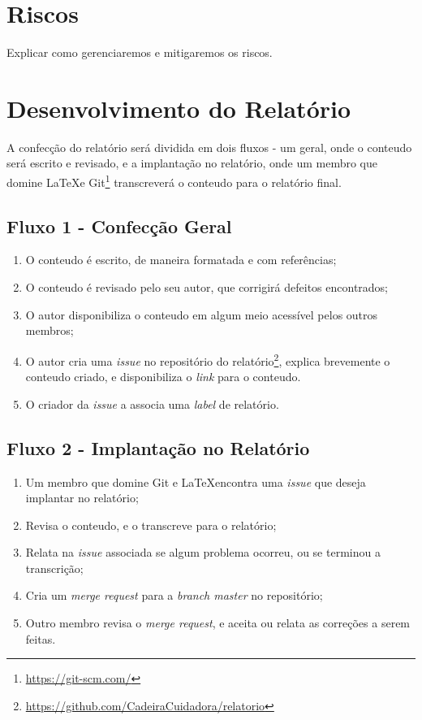 \section{Riscos}

Explicar como gerenciaremos e mitigaremos os riscos.

\section{Desenvolvimento do Relatório}

A confecção do relatório será dividida em dois fluxos - um geral, onde o
conteudo será escrito e revisado, e a implantação no relatório, onde um
membro que domine \LaTeX e
Git\footnote{\url{https://git-scm.com/}} transcreverá o conteudo para o
relatório final.

\subsection{Fluxo 1 - Confecção Geral}

\begin{enumerate}
  \item O conteudo é escrito, de maneira formatada e com referências;
  \item O conteudo é revisado pelo seu autor, que corrigirá defeitos encontrados;
  \item O autor disponibiliza o conteudo em algum meio acessível pelos outros membros;
  \item O autor cria uma \textit{issue} no repositório do
    relatório\footnote{\url{https://github.com/CadeiraCuidadora/relatorio}}, explica brevemente
    o conteudo criado, e disponibiliza o \textit{link} para o conteudo.
  \item O criador da \textit{issue} a associa uma \textit{label} de relatório.
\end{enumerate}

\subsection{Fluxo 2 - Implantação no Relatório}

\begin{enumerate}
  \item Um membro que domine Git e \LaTeX encontra uma \textit{issue} que deseja
  implantar no relatório;
  \item Revisa o conteudo, e o transcreve para o relatório;
  \item Relata na \textit{issue} associada se algum problema ocorreu, ou se terminou a transcrição;
  \item Cria um \textit{merge request} para a \textit{branch master} no repositório;
  \item Outro membro revisa o \textit{merge request}, e aceita ou relata as correções a serem feitas.
\end{enumerate}

